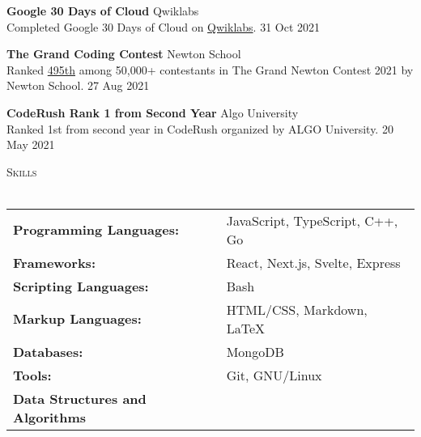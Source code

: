 \documentclass[a4paper]{article}
\newcommand{\lineunder} {
    \vspace*{-8pt} \\
    \hspace*{-18pt} \hrulefill \\
}
\newcommand{\header} [1] {
    {\hspace*{-18pt}\vspace*{6pt} \textsc{#1}}
    \vspace*{-6pt} \lineunder
}
\begin{document}
\textbf{Google 30 Days of Cloud} \hfill Qwiklabs\\
Completed Google 30 Days of Cloud on \href{https://www.qwiklabs.com/public_profiles/4c78c6d8-ad43-4991-b8fe-03e559c1bac5}{Qwiklabs}. \hfill 31 Oct 2021\\
\vspace*{1mm}

\textbf{The Grand Coding Contest} \hfill Newton School\\
Ranked \href{https://www.linkedin.com/posts/aryanpathania03_aryan-has-secured-rank-495-in-newtons-grand-activity-6841777869484642304-YhKD}{495th} among 50,000+ contestants in The Grand Newton Contest 2021 by Newton School. \hfill 27 Aug 2021\\
\vspace*{1mm}

\textbf{CodeRush Rank 1 from Second Year} \hfill Algo University\\
Ranked 1st from second year in CodeRush organized by ALGO University. \hfill 20 May 2021\\
\vspace*{1.5mm}



\header{Skills}
\vspace{1mm}
\begin{tabular}{ l l }
	\textbf{Programming Languages:} & JavaScript, TypeScript, C++, Go \\
	\textbf{Frameworks:} & React, Next.js, Svelte, Express \\
	\textbf{Scripting Languages:} & Bash \\
	\textbf{Markup Languages:} & HTML/CSS, Markdown, \LaTeX \\
	\textbf{Databases:} & MongoDB \\
	\textbf{Tools:} & Git, GNU/Linux \\
	\textbf{Data Structures and Algorithms} \\
\end{tabular}
\vspace{1.5mm}
\end{document}
